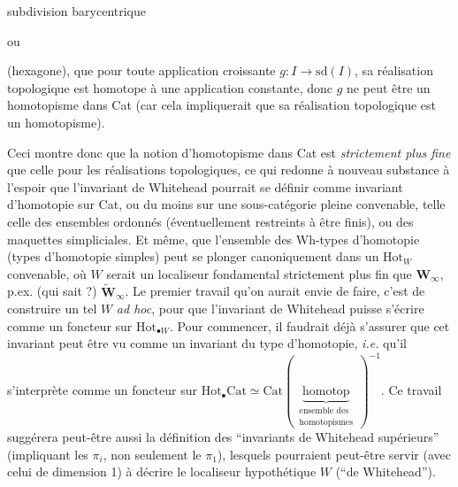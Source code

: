\documentclass[11pt]{article}
\newcommand{\printedpage}[1]{\marginpar{\footnotesize p.~#1}}
\newcommand{\msp}[1]{\marginpar{\footnotesize [#1]}}
\begin{document}
subdivision barycentrique
\printedpage{48}

\begin{center}
\qquad\qquad\qquad ou \qquad\qquad\qquad
{}
\end{center}

(hexagone), que pour toute application croissante $g : I \longrightarrow \mathrm{sd}(I)$, sa réalisation topologique est homotope à une application constante, donc $g$ ne peut être un homotopisme dans Cat (car cela impliquerait que sa réalisation topologique est un homotopisme).

Ceci montre donc que la notion d'homotopisme dans Cat est \textit{strictement plus fine} que celle pour les réalisations topologiques, ce qui redonne à nouveau substance à l'espoir que l'invariant de Whitehead pourrait se définir comme invariant d'homotopie sur Cat, ou du moins sur une sous-catégorie pleine convenable, telle celle des ensembles ordonnés (éventuellement restreints à être finis), ou des maquettes simpliciales. Et même, que l'ensemble des Wh-types d'homotopie (types d'homotopie simples) peut se
\msp{page 96}
plonger canoniquement dans un $\mathrm{Hot}_W$ convenable, où $W$ serait un localiseur fondamental strictement plus fin que $\mathbf{W}_\infty$, p.ex. (qui sait ?) $\tilde{\mathbf{W}}_\infty$. Le premier travail qu'on aurait envie de faire, c'est de construire un tel $W$ \textit{ad hoc}, pour que l'invariant de Whitehead puisse s'écrire comme un foncteur sur $\mathrm{Hot}_{\bullet W}$. Pour commencer, il faudrait déjà s'assurer que cet invariant peut être vu comme un invariant du type d'homotopie, \textit{i.e.} qu'il s'interprète comme un foncteur sur $\mathrm{Hot}_{\bullet}\mathrm{Cat} \simeq \mathrm{Cat}(\,\underbrace{\text{homotop}}_{\substack{\text{ensemble des}\\ \text{homotopismes}}}\,)^{-1}$. Ce travail suggérera peut-être aussi la définition des “invariants de Whitehead supérieurs” (impliquant les $\pi_i$, non seulement le $\pi_1$), lesquels pourraient peut-être servir (avec celui de dimension 1) à décrire le localiseur hypothétique $W$ (“de Whitehead”).
\end{document}
